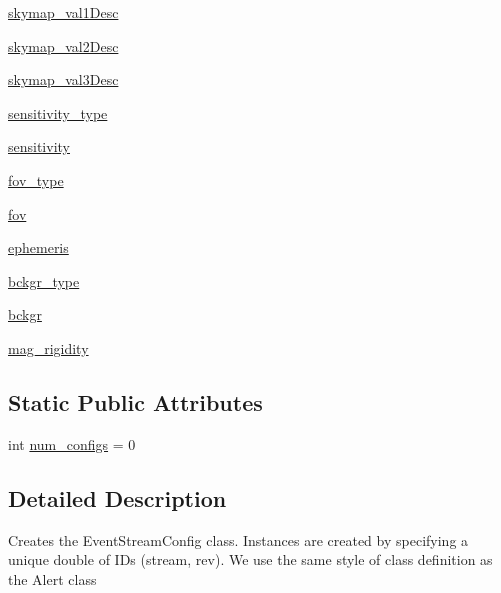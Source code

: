 \begin{DoxyCompactItemize}
\item 
\hyperlink{classamonpy_1_1dbase_1_1db__classes_1_1_event_stream_config_aaa2d6050a201048d2b2b16a4bb8faadb}{skymap\-\_\-val1\-Desc}
\item 
\hyperlink{classamonpy_1_1dbase_1_1db__classes_1_1_event_stream_config_a6db55d42905ecef2b4e46954edbab4d2}{skymap\-\_\-val2\-Desc}
\item 
\hyperlink{classamonpy_1_1dbase_1_1db__classes_1_1_event_stream_config_a017bb151fd3191f77338d6a9b78de0e2}{skymap\-\_\-val3\-Desc}
\item 
\hyperlink{classamonpy_1_1dbase_1_1db__classes_1_1_event_stream_config_afbac8232bbe89354fe55e04ae4864500}{sensitivity\-\_\-type}
\item 
\hyperlink{classamonpy_1_1dbase_1_1db__classes_1_1_event_stream_config_aff848f1925c8a6758214867b77689078}{sensitivity}
\item 
\hyperlink{classamonpy_1_1dbase_1_1db__classes_1_1_event_stream_config_aab09fd614aaa3622511e1602d11d3bd6}{fov\-\_\-type}
\item 
\hyperlink{classamonpy_1_1dbase_1_1db__classes_1_1_event_stream_config_a4c75df86251d603bf833057074b410da}{fov}
\item 
\hyperlink{classamonpy_1_1dbase_1_1db__classes_1_1_event_stream_config_a4b9131b75912c1e97f4e1b2b0402e4df}{ephemeris}
\item 
\hyperlink{classamonpy_1_1dbase_1_1db__classes_1_1_event_stream_config_a9d38a72e46882f06eb9e8a537e34148d}{bckgr\-\_\-type}
\item 
\hyperlink{classamonpy_1_1dbase_1_1db__classes_1_1_event_stream_config_a0914f43a8987820fafcb4eeffc1db845}{bckgr}
\item 
\hyperlink{classamonpy_1_1dbase_1_1db__classes_1_1_event_stream_config_ac3b7f4099b9bfeb3e80b20b842acdca6}{mag\-\_\-rigidity}
\end{DoxyCompactItemize}
\subsection*{Static Public Attributes}
\begin{DoxyCompactItemize}
\item 
int \hyperlink{classamonpy_1_1dbase_1_1db__classes_1_1_event_stream_config_a38d111218c593bec75f262725f91f5d2}{num\-\_\-configs} = 0
\end{DoxyCompactItemize}


\subsection{Detailed Description}
\begin{DoxyVerb}Creates the EventStreamConfig class. Instances are created by
    specifying a unique double of IDs (stream, rev). We use the same
    style of class definition as the Alert class
\end{DoxyVerb}
 

